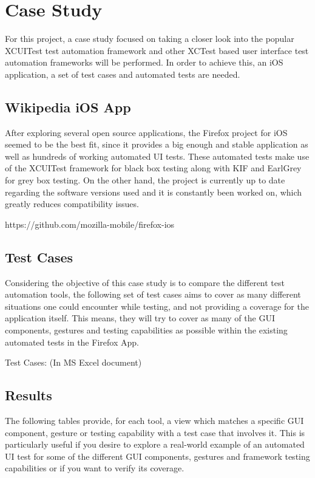 \chapter{Case Study}
\label{chapter3}

For this project, a case study focused on taking a closer look into the popular XCUITest test automation framework and other XCTest based user interface test automation frameworks will be performed. In order to achieve this, an iOS application, a set of test cases and automated tests are needed.




\section{Wikipedia iOS App}
After exploring several open source applications, the Firefox project for iOS seemed to be the best fit, since it provides a big enough and stable application as well as hundreds of working automated UI tests. These automated tests make use of the XCUITest framework for black box testing along with KIF and EarlGrey for grey box testing. On the other hand, the project is currently up to date regarding the software versions used and it is constantly been worked on, which greatly reduces compatibility issues.

https://github.com/mozilla-mobile/firefox-ios

\section{Test Cases}
Considering the objective of this case study is to compare the different test automation tools, the following set of test cases aims to cover as many different situations one could encounter while testing, and not providing a coverage for the application itself. This means, they will try to cover as many of the GUI components, gestures and testing capabilities as possible within the existing automated tests in the Firefox App.

Test Cases: (In MS Excel document)

\section{Results}
The following tables provide, for each tool, a view which matches a specific GUI component, gesture or testing capability with a test case that involves it. This is particularly useful if you desire to explore a real-world example of an automated UI test for some of the different GUI components, gestures and framework testing capabilities or if you want to verify its coverage.


